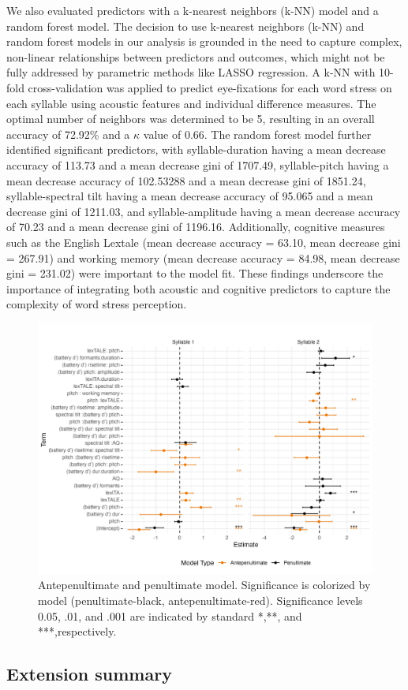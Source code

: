 We also evaluated predictors with a k-nearest neighbors (k-NN) model and a random forest model. The decision to use k-nearest neighbors (k-NN) and random forest models in our analysis is grounded in the need to capture complex, non-linear relationships between predictors and outcomes, which might not be fully addressed by parametric methods like LASSO regression. A k-NN with 10-fold cross-validation was applied to predict eye-fixations for each word stress on each syllable using acoustic features and individual difference measures. The optimal number of neighbors was determined to be 5, resulting in an overall accuracy of 72.92\% and a $\kappa$ value of 0.66. The random forest model further identified significant predictors, with syllable-duration having a mean decrease accuracy of 113.73 and a mean decrease gini of 1707.49, syllable-pitch having a mean decrease accuracy of 102.53288 and a mean decrease gini of 1851.24, syllable-spectral tilt having a mean decrease accuracy of 95.065 and a mean decrease gini of 1211.03, and syllable-amplitude having a mean decrease accuracy of 70.23 and a mean decrease gini of 1196.16. Additionally, cognitive measures such as the English Lextale (mean decrease accuracy = 63.10, mean decrease gini = 267.91) and working memory (mean decrease accuracy = 84.98, mean decrease gini = 231.02) were important to the model fit. These findings underscore the importance of integrating both acoustic and cognitive predictors to capture the complexity of word stress perception.

\begin{figure}[H]
  \centering
  \includegraphics[width=1\linewidth]{visuals/extended_analysis.jpeg} %
  \caption{Antepenultimate and penultimate model. Significance is colorized by model (penultimate-black, antepenultimate-red). Significance levels 0.05, .01, and .001 are indicated by standard *,**, and ***,respectively.}
  \label{fig:extened_analysis}
\end{figure}


\subsection{Extension summary}

